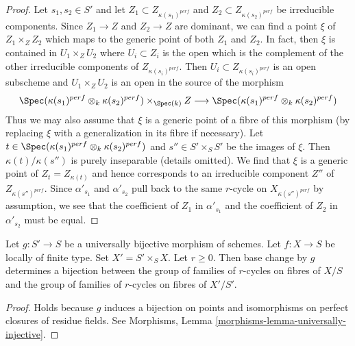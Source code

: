 \begin{proof}
\medskip\noindent
Let $s_1, s_2 \in S'$ and let $Z_1 \subset Z_{\kappa(s_1)^{perf}}$
and $Z_2 \subset Z_{\kappa(s_2)^{perf}}$ be irreducible components.
Since $Z_1 \to Z$ and $Z_2 \to Z$ are dominant, we can find a point
$\xi$ of $Z_1 \times_Z Z_2$ which maps to the generic point of both
$Z_1$ and $Z_2$. In fact, then $\xi$ is contained in $U_1 \times_Z U_2$
where $U_i \subset Z_i$ is the open which is the complement of the
other irreducible components of $Z_{\kappa(s_i)^{perf}}$. Then
$U_i \subset Z_{\kappa(s_i)^{perf}}$ is an open subscheme and
$U_1 \times_Z U_2$ is an open in the source of the morphism
$$
\Spec(\kappa(s_1)^{perf} \otimes_k \kappa(s_2)^{perf})
\times_{\Spec(k)} Z
\longrightarrow
\Spec(\kappa(s_1)^{perf} \otimes_k \kappa(s_2)^{perf})
$$
Thus we may also assume that $\xi$ is a generic point
of a fibre of this morphism (by replacing $\xi$ with a generalization
in its fibre if necessary). Let
$t \in \Spec(\kappa(s_1)^{perf} \otimes_k \kappa(s_2)^{perf})$
and $s'' \in S' \times_S S'$ be the images of $\xi$.
Then $\kappa(t)/\kappa(s'')$ is purely inseparable (details omitted).
We find that $\xi$ is a generic point of $Z_t = Z_{\kappa(t)}$
and hence corresponds to an irreducible component $Z''$
of $Z_{\kappa(s'')^{perf}}$.
Since $\alpha'_{s_1}$ and $\alpha'_{s_2}$ pull back to
the same $r$-cycle on $X_{\kappa(s'')^{perf}}$ by assumption, 
we see that the coefficient of
$Z_1$ in $\alpha'_{s_1}$ and the coefficient of $Z_2$
in $\alpha'_{s_2}$ must be equal.
\end{proof}

\begin{lemma}
\label{lemma-pullback-universally-bijective}
Let $g : S' \to S$ be a universally bijective morphism of schemes.
Let $f : X \to S$ be locally of finite type. Set $X' = S' \times_S X$.
Let $r \geq 0$. Then base change by $g$ determines a bijection
between the group of families of $r$-cycles on fibres of $X/S$ and
the group of families of $r$-cycles on fibres of $X'/S'$.
\end{lemma}

\begin{proof}
Holds because $g$ induces a bijection on points and isomorphisms
on perfect closures of residue fields. See Morphisms, Lemma
\ref{morphisms-lemma-universally-injective}.
\end{proof}















